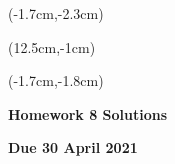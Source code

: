 \documentclass[12pt, oneside]{article}
\begin{document}
\begin{textblock*}{4cm}(-1.7cm,-2.3cm)
\end{textblock*}

\begin{textblock*}{8cm}(12.5cm,-1cm)
\end{textblock*}
\begin{textblock*}{13.5cm}(-1.7cm,-1.8cm)
\end{textblock*}

\vspace{1cm}

\begin{center}
\textbf{\Large Homework 8 Solutions}

\textbf{Due 30 April 2021}
\end{center}
\end{document}
